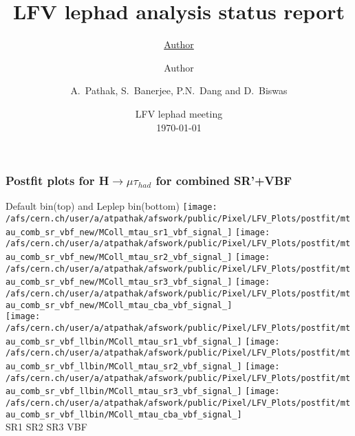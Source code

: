 \documentclass{beamer}
\title{LFV lephad analysis status report} %
\author{\underline{Author} \and Author} %
\author{A.~Pathak, S.~Banerjee, P.N.~Dang and D.~Biswas}
\institute{\begin{minipage}{0.5\textwidth}\centering
\texttt{[image: /afs/cern.ch/user/s/swaban/public/university-of-louisville-logo.png]}
\end{minipage}}
\date{{LFV lephad meeting}\\\today\\} %
\begin{document}
\begin{frame}
\titlepage %
\end{frame}
\begin{frame}
\frametitle{Postfit plots for H$\rightarrow \mu\tau_{had}$ for combined SR'+VBF}
\begin{normalsize}
Default bin(top) and Leplep bin(bottom)
\vspace*{0.5cm}
\texttt{[image: /afs/cern.ch/user/a/atpathak/afswork/public/Pixel/LFV\_Plots/postfit/mtau\_comb\_sr\_vbf\_new/MColl\_mtau\_sr1\_vbf\_signal\_]}
\texttt{[image: /afs/cern.ch/user/a/atpathak/afswork/public/Pixel/LFV\_Plots/postfit/mtau\_comb\_sr\_vbf\_new/MColl\_mtau\_sr2\_vbf\_signal\_]}
\texttt{[image: /afs/cern.ch/user/a/atpathak/afswork/public/Pixel/LFV\_Plots/postfit/mtau\_comb\_sr\_vbf\_new/MColl\_mtau\_sr3\_vbf\_signal\_]}
\texttt{[image: /afs/cern.ch/user/a/atpathak/afswork/public/Pixel/LFV\_Plots/postfit/mtau\_comb\_sr\_vbf\_new/MColl\_mtau\_cba\_vbf\_signal\_]}\\
\texttt{[image: /afs/cern.ch/user/a/atpathak/afswork/public/Pixel/LFV\_Plots/postfit/mtau\_comb\_sr\_vbf\_llbin/MColl\_mtau\_sr1\_vbf\_signal\_]}
\texttt{[image: /afs/cern.ch/user/a/atpathak/afswork/public/Pixel/LFV\_Plots/postfit/mtau\_comb\_sr\_vbf\_llbin/MColl\_mtau\_sr2\_vbf\_signal\_]}
\texttt{[image: /afs/cern.ch/user/a/atpathak/afswork/public/Pixel/LFV\_Plots/postfit/mtau\_comb\_sr\_vbf\_llbin/MColl\_mtau\_sr3\_vbf\_signal\_]}
\texttt{[image: /afs/cern.ch/user/a/atpathak/afswork/public/Pixel/LFV\_Plots/postfit/mtau\_comb\_sr\_vbf\_llbin/MColl\_mtau\_cba\_vbf\_signal\_]}\\
\hspace{0.5in}SR1 
\hspace{0.75in}SR2
\hspace{0.75in}SR3
\hspace{0.75in}VBF
\end{normalsize}
\end{frame}
\end{document}
